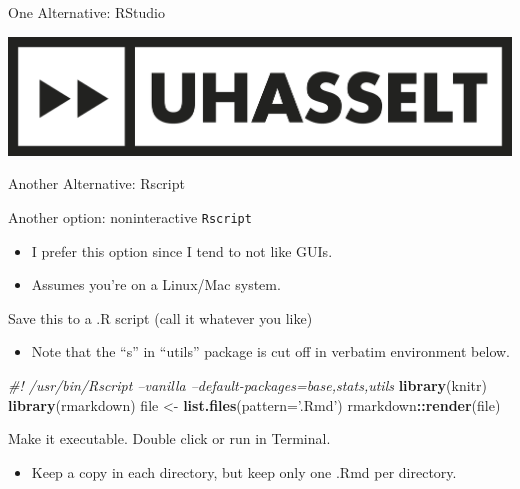 \documentclass[10pt,ignorenonframetext,]{beamer}
\newenvironment{Shaded}{\begin{snugshade}}{\end{snugshade}}
\newcommand{\CommentTok}[1]{\textcolor[rgb]{0.56,0.35,0.01}{\textit{#1}}}
\newcommand{\DataTypeTok}[1]{\textcolor[rgb]{0.13,0.29,0.53}{#1}}
\newcommand{\KeywordTok}[1]{\textcolor[rgb]{0.13,0.29,0.53}{\textbf{#1}}}
\newcommand{\NormalTok}[1]{#1}
\newcommand{\OperatorTok}[1]{\textcolor[rgb]{0.81,0.36,0.00}{\textbf{#1}}}
\newcommand{\StringTok}[1]{\textcolor[rgb]{0.31,0.60,0.02}{#1}}
\providecommand{\tightlist}{%
  \setlength{\itemsep}{0pt}\setlength{\parskip}{0pt}}
\begin{document}
\begin{frame}{One Alternative: RStudio}
\protect\hypertarget{one-alternative-rstudio}{}

\begin{center}
  \includegraphics[width=1.00\textwidth]{uhasselt_logo.png}
\end{center}

\end{frame}

\begin{frame}[fragile]{Another Alternative: Rscript}
\protect\hypertarget{another-alternative-rscript}{}

Another option: noninteractive \texttt{Rscript}

\begin{itemize}
\tightlist
\item
  I prefer this option since I tend to not like GUIs.
\item
  Assumes you're on a Linux/Mac system.
\end{itemize}

Save this to a .R script (call it whatever you like)

\begin{itemize}
\tightlist
\item
  Note that the ``s'' in ``utils'' package is cut off in verbatim
  environment below.
\end{itemize}

\begin{Shaded}
\begin{Highlighting}[]
\CommentTok{#! /usr/bin/Rscript --vanilla --default-packages=base,stats,utils}
\KeywordTok{library}\NormalTok{(knitr)}
\KeywordTok{library}\NormalTok{(rmarkdown)}
\NormalTok{file <-}\StringTok{ }\KeywordTok{list.files}\NormalTok{(}\DataTypeTok{pattern=}\StringTok{'.Rmd'}\NormalTok{)}
\NormalTok{rmarkdown}\OperatorTok{::}\KeywordTok{render}\NormalTok{(file)}
\end{Highlighting}
\end{Shaded}

Make it executable. Double click or run in Terminal.

\begin{itemize}
\tightlist
\item
  Keep a copy in each directory, but keep only one .Rmd per directory.
\end{itemize}

\end{frame}
\end{document}
